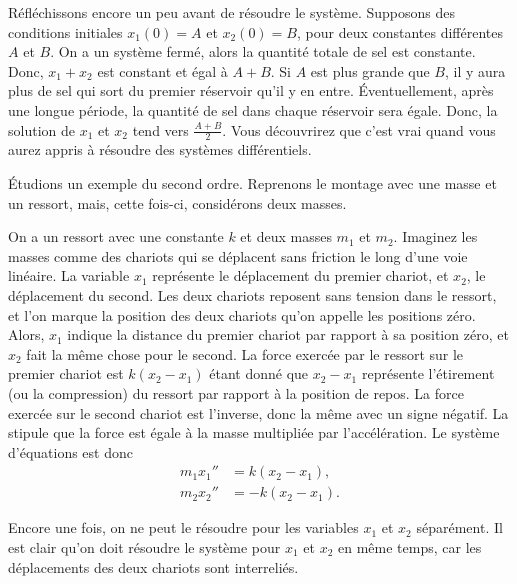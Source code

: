 \begin{example}
Réfléchissons encore un peu avant de résoudre le système. Supposons des conditions initiales $x_1(0) = A$ et $x_2(0) = B$, pour deux constantes différentes $A$ et $B$. On a un système fermé, alors la quantité totale de sel est constante. Donc, $x_1+x_2$ est constant et égal à $A+B$.
Si $A$ est plus grande que $B$, il y aura plus de sel qui sort du premier réservoir qu'il y en entre. Éventuellement, après une longue période, la quantité de sel dans chaque réservoir sera égale. Donc, la solution de $x_1$ et $x_2$ tend vers $\frac{A+B}{2}$. Vous découvrirez que c'est vrai quand vous aurez appris à résoudre des systèmes différentiels.
\end{example}

\begin{example} \label{sintro:carts-example}
Étudions un exemple du second ordre. Reprenons le montage avec une masse et un ressort, mais, cette fois-ci, considérons deux masses.

\begin{mywrapfigsimp}{2.0in}{2.3in}
\noindent
{}
\end{mywrapfigsimp}
On a un ressort avec une constante $k$ et deux masses $m_1$
et $m_2$. Imaginez les masses comme des chariots qui se déplacent sans friction le long d'une voie linéaire. La variable $x_1$ représente le déplacement du premier chariot, et $x_2$, le déplacement du second. Les deux chariots reposent sans tension dans le ressort, et l'on marque la position des deux chariots qu'on appelle les positions zéro. Alors, $x_1$ indique la distance du premier chariot par rapport à sa position zéro, et $x_2$ fait la même chose pour le second. La force exercée par le ressort sur le premier chariot est
$k(x_2-x_1)$ étant donné que 
$x_2-x_1$ représente l'étirement (ou la compression) du ressort par rapport à la position de repos. La force exercée sur le second chariot est l'inverse, donc la même avec un signe négatif. La 
 stipule que la force est égale à la masse multipliée par l'accélération. Le système d'équations est donc
\begin{align*}
m_1 x_1'' & = k(x_2-x_1) , \\
m_2 x_2'' & = - k(x_2-x_1) .
\end{align*}

Encore une fois, on ne peut le résoudre pour les variables $x_1$ et $x_2$ séparément. Il est clair qu'on doit résoudre le système pour $x_1$ et $x_2$ en même temps, car les déplacements des deux chariots sont interreliés.
\end{example}

